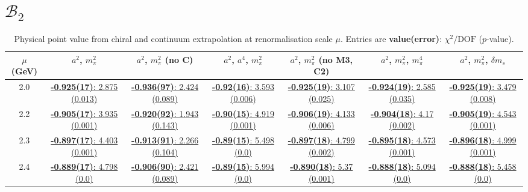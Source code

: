 \documentclass[12pt]{extarticle}
\begin{document}
\section{$\mathcal{B}_2$}
\begin{table}[h!]
\begin{center}
\begin{tabular}{|c|c|c|c|c|c|c|}
\hline
$\mu$ (GeV) & $a^2$, $m_\pi^2$& $a^2$, $m_\pi^2$ (no C)& $a^2$, $a^4$, $m_\pi^2$& $a^2$, $m_\pi^2$ (no M3, C2)& $a^2$, $m_\pi^2$, $m_\pi^4$& $a^2$, $m_\pi^2$, $\delta m_s$\\
\hline
2.0& \hyperlink{VVmAA/SUSY/a2m2_20.pdf.1}{\textbf{-0.925(17)}: 2.875 (0.013)} & \hyperlink{VVmAA/SUSY/a2m2noC_20.pdf.1}{\textbf{-0.936(97)}: 2.424 (0.089)} & \hyperlink{VVmAA/SUSY/a2a4m2_20.pdf.1}{\textbf{-0.92(16)}: 3.593 (0.006)} & \hyperlink{VVmAA/SUSY/a2m2mcut_20.pdf.1}{\textbf{-0.925(19)}: 3.107 (0.025)} & \hyperlink{VVmAA/SUSY/a2m2m4_20.pdf.1}{\textbf{-0.924(19)}: 2.585 (0.035)} & \hyperlink{VVmAA/SUSY/a2m2delm_20.pdf.1}{\textbf{-0.925(19)}: 3.479 (0.008)}\\
2.2& \hyperlink{VVmAA/SUSY/a2m2_22.pdf.1}{\textbf{-0.905(17)}: 3.935 (0.001)} & \hyperlink{VVmAA/SUSY/a2m2noC_22.pdf.1}{\textbf{-0.920(92)}: 1.943 (0.143)} & \hyperlink{VVmAA/SUSY/a2a4m2_22.pdf.1}{\textbf{-0.90(15)}: 4.919 (0.001)} & \hyperlink{VVmAA/SUSY/a2m2mcut_22.pdf.1}{\textbf{-0.906(19)}: 4.133 (0.006)} & \hyperlink{VVmAA/SUSY/a2m2m4_22.pdf.1}{\textbf{-0.904(18)}: 4.17 (0.002)} & \hyperlink{VVmAA/SUSY/a2m2delm_22.pdf.1}{\textbf{-0.905(19)}: 4.543 (0.001)}\\
2.3& \hyperlink{VVmAA/SUSY/a2m2_23.pdf.1}{\textbf{-0.897(17)}: 4.403 (0.001)} & \hyperlink{VVmAA/SUSY/a2m2noC_23.pdf.1}{\textbf{-0.913(91)}: 2.266 (0.104)} & \hyperlink{VVmAA/SUSY/a2a4m2_23.pdf.1}{\textbf{-0.89(15)}: 5.498 (0.0)} & \hyperlink{VVmAA/SUSY/a2m2mcut_23.pdf.1}{\textbf{-0.897(18)}: 4.799 (0.002)} & \hyperlink{VVmAA/SUSY/a2m2m4_23.pdf.1}{\textbf{-0.895(18)}: 4.573 (0.001)} & \hyperlink{VVmAA/SUSY/a2m2delm_23.pdf.1}{\textbf{-0.896(18)}: 4.999 (0.001)}\\
2.4& \hyperlink{VVmAA/SUSY/a2m2_24.pdf.1}{\textbf{-0.889(17)}: 4.798 (0.0)} & \hyperlink{VVmAA/SUSY/a2m2noC_24.pdf.1}{\textbf{-0.906(90)}: 2.421 (0.089)} & \hyperlink{VVmAA/SUSY/a2a4m2_24.pdf.1}{\textbf{-0.89(15)}: 5.994 (0.0)} & \hyperlink{VVmAA/SUSY/a2m2mcut_24.pdf.1}{\textbf{-0.890(18)}: 5.37 (0.001)} & \hyperlink{VVmAA/SUSY/a2m2m4_24.pdf.1}{\textbf{-0.888(18)}: 5.094 (0.0)} & \hyperlink{VVmAA/SUSY/a2m2delm_24.pdf.1}{\textbf{-0.888(18)}: 5.458 (0.0)}\\
\hline
\end{tabular}
\caption{Physical point value from chiral and continuum extrapolation at renormalisation scale $\mu$. Entries are \textbf{value(error)}: $\chi^2/\text{DOF}$ ($p$-value).}
\end{center}
\end{table}
\end{document}
